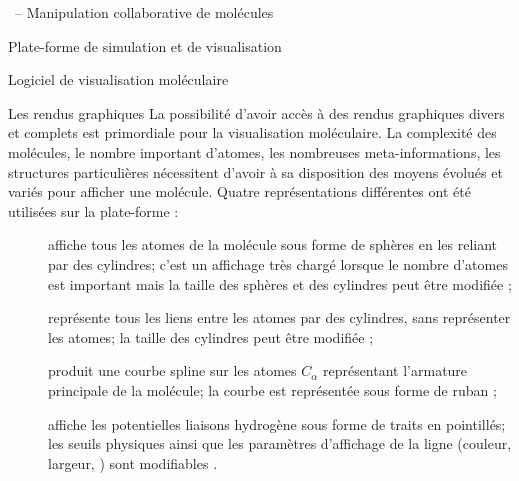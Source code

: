 \documentclass[myfrancais]{mythesis}
\begin{document}
\begin{mychapter}{\myShaddock\ -- Manipulation collaborative de molécules}
\begin{mysection}{Plate-forme de simulation et de visualisation}
\begin{mysubsection}{Logiciel de visualisation moléculaire}
				\begin{mysubsubsection}{Les rendus graphiques}
					La possibilité d'avoir accès à des rendus graphiques divers et complets est primordiale pour la visualisation moléculaire.
					La complexité des molécules, le nombre important d'atomes, les nombreuses meta-informations, les structures particulières nécessitent d'avoir à sa disposition des moyens évolués et variés pour afficher une molécule.
					Quatre représentations différentes  ont été utilisées sur la plate-forme \myShaddock :
					\begin{description}
						\item[\myCPK] affiche tous les atomes de la molécule sous forme de sphères en les reliant par des cylindres; c'est un affichage très chargé lorsque le nombre d'atomes est important mais la taille des sphères et des cylindres peut être modifiée ;
						\item[\myLicorice] représente tous les liens entre les atomes par des cylindres, sans représenter les atomes; la taille des cylindres peut être modifiée ;
						\item[\myNewRibbon] produit une courbe spline sur les atomes $C_{\alpha}$ représentant l'armature principale de la molécule; la courbe est représentée sous forme de ruban ;
						\item[\myHBonds] affiche les potentielles liaisons hydrogène sous forme de traits en pointillés; les seuils physiques ainsi que les paramètres d'affichage de la ligne (couleur, largeur, \myetc) sont modifiables .
					\end{description}


\end{mysubsubsection}
\end{mysubsection}
\end{mysection}
\end{mychapter}
\end{document}
